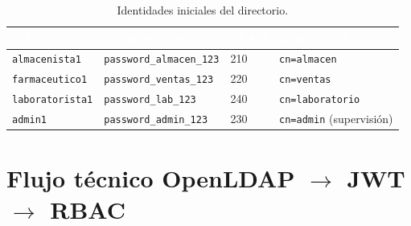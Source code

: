 \documentclass[11pt,a4paper,oneside]{report}
\newcommand{\cod}[1]{\texttt{\small #1}}
\begin{document}
\begin{table}[htbp]
\centering\small
\caption{Identidades iniciales del directorio.}
\label{tab:usuarios}
\begin{tabular}{@{}l l l l@{}}
\toprule
\rowcolor{fvVerdeOsc}
\textcolor{white}{\textbf{uid}} & \textcolor{white}{\textbf{Contraseña inicial}} &
\textcolor{white}{\textbf{VLAN}} & \textcolor{white}{\textbf{Grupo / rol}} \\
\midrule
\cod{almacenista1}   & \cod{password\_almacen\_123} & 210 & \cod{cn=almacen} \\
\cod{farmaceutico1}  & \cod{password\_ventas\_123}  & 220 & \cod{cn=ventas} \\
\cod{laboratorista1} & \cod{password\_lab\_123}     & 240 & \cod{cn=laboratorio} \\
\cod{admin1}         & \cod{password\_admin\_123}   & 230 & \cod{cn=admin} (supervisión) \\
\bottomrule
\end{tabular}
\end{table}

\section{Flujo técnico OpenLDAP $\rightarrow$ JWT $\rightarrow$ RBAC}
\end{document}
